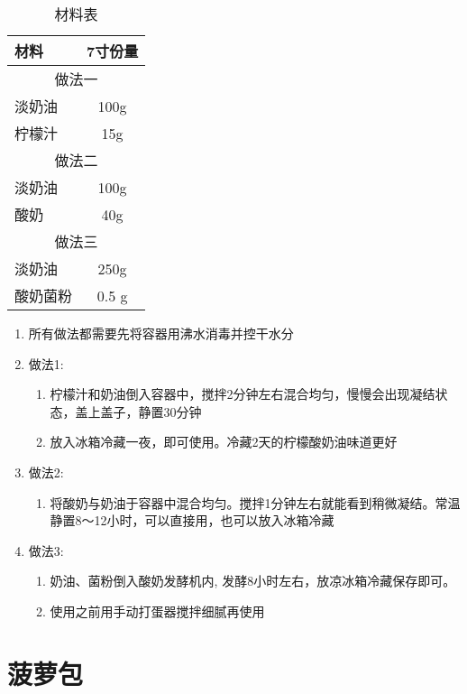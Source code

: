 \begin{table}[h]
    \centering
    \begin{tabular}{|l||c|}\hline
     \textbf{材料}    &  \textbf{7寸份量}\\ \hline\hline
    \multicolumn{2}{|c|}{做法一}\\ \hline
    淡奶油 & 100g \\ \hline
    柠檬汁 & 15g \\ \hline
    \multicolumn{2}{|c|}{做法二}\\ \hline
    淡奶油     &  100g \\ \hline
    酸奶     &  40g \\ \hline
    \multicolumn{2}{|c|}{做法三}\\ \hline
    淡奶油 & 250g \\ \hline
    酸奶菌粉 & 0.5 g \\ \hline
    \end{tabular}
    \caption{材料表}
\end{table}

\begin{enumerate}
    \item 所有做法都需要先将容器用沸水消毒并控干水分
    \item 做法1:
    \begin{enumerate}
    \item 柠檬汁和奶油倒入容器中，搅拌2分钟左右混合均匀，慢慢会出现凝结状态，盖上盖子，静置30分钟
    \item 放入冰箱冷藏一夜，即可使用。冷藏2天的柠檬酸奶油味道更好
    \end{enumerate}
 
    \item 做法2:
    \begin{enumerate}
    \item 将酸奶与奶油于容器中混合均匀。搅拌1分钟左右就能看到稍微凝结。常温静置8～12小时，可以直接用，也可以放入冰箱冷藏
    \end{enumerate}
    \item 做法3:
    \begin{enumerate}
    \item 奶油、菌粉倒入酸奶发酵机内, 发酵8小时左右，放凉冰箱冷藏保存即可。
    \item 使用之前用手动打蛋器搅拌细腻再使用
    \end{enumerate}
\end{enumerate}


\section{菠萝包}

